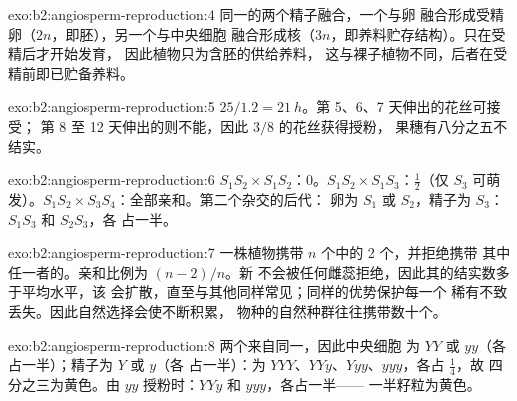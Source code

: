 \begin{solution}{exo:b2:angiosperm-reproduction:4}
同一的两个精子融合，一个与卵
融合形成受精卵（$2n$，即胚），另一个与中央细胞
融合形成核（$3n$，即养料贮存结构）。只在受精后才开始发育，
因此植物只为含胚的供给养料，
这与裸子植物不同，后者在受精前即已贮备养料。
\end{solution}

\begin{solution}{exo:b2:angiosperm-reproduction:5}
$25/1.2 = \qty{21}{h}$。第 5、6、7 天伸出的花丝可接受；
第 8 至 12 天伸出的则不能，因此 $3/8$ 的花丝获得授粉，
果穗有八分之五不结实。
\end{solution}

\begin{solution}{exo:b2:angiosperm-reproduction:6}
$S_1S_2\times S_1S_2$：0。$S_1S_2\times S_1S_3$：$\tfrac12$（仅 $S_3$
可萌发）。$S_1S_2\times S_3S_4$：全部亲和。第二个杂交的后代：
卵为 $S_1$ 或 $S_2$，精子为 $S_3$：$S_1S_3$ 和 $S_2S_3$，各
占一半。
\end{solution}

\begin{solution}{exo:b2:angiosperm-reproduction:7}
一株植物携带 $n$ 个中的 2 个，并拒绝携带
其中任一者的。亲和比例为 $(n - 2)/n$。新
不会被任何雌蕊拒绝，因此其的结实数多于平均水平，该
会扩散，直至与其他同样常见；同样的优势保护每一个
稀有不致丢失。因此自然选择会使不断积累，
物种的自然种群往往携带数十个。
\end{solution}

\begin{solution}{exo:b2:angiosperm-reproduction:8}
两个来自同一，因此中央细胞
为 $YY$ 或 $yy$（各占一半）；精子为 $Y$ 或 $y$（各
占一半）：为 $YYY$、$YYy$、$Yyy$、$yyy$，各占 $\tfrac14$，故
四分之三为黄色。由 $yy$ 授粉时：$YYy$ 和 $yyy$，各占一半——
一半籽粒为黄色。
\end{solution}

